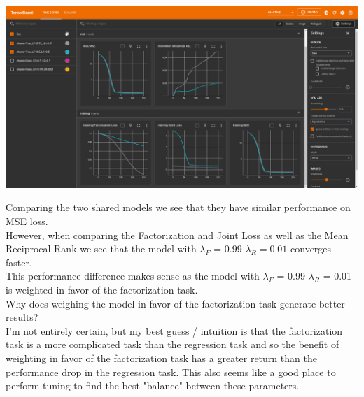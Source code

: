 \begin{answer}
	\begin{center}
		\includegraphics[width=1.0\textwidth]{SharedModelDifference}
	\end{center}
	Comparing the two shared models we see that they have similar performance on MSE loss. \\
	However, when comparing the Factorization and Joint Loss as well as the Mean Reciprocal Rank we see that the model with $\lambda_{F}$ = 0.99 $\lambda_{R} = 0.01$ converges faster. \\
	This performance difference makes sense as the model with $\lambda_{F}$ = 0.99 $\lambda_{R}$ = 0.01 is weighted in favor of the factorization task. \\
	Why does weighing the model in favor of the factorization task generate better results? \\
	I'm not entirely certain, but my best guess / intuition is that the factorization task is a more complicated task than the regression task and so the benefit of weighting in favor of the factorization task has a greater return than the performance drop in the regression task. This also seems like a good place to perform tuning to find the best "balance" between these parameters.
\end{answer}



